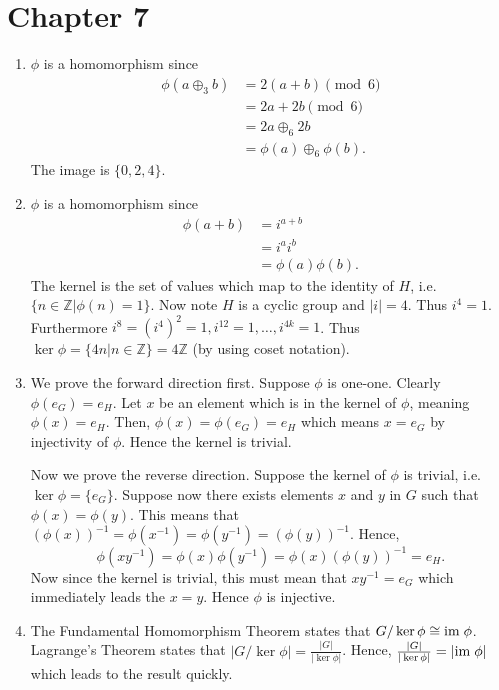 \section*{Chapter 7}
\begin{enumerate}
    \item $\phi$ is a homomorphism since
    \begin{align*}
        \phi(a \oplus_3 b) &= 2(a+b) \pmod{6}\\
        &= 2a + 2b \pmod{6}\\
        &= 2a \oplus_6 2b\\
        &= \phi(a) \oplus_6 \phi(b).
    \end{align*}
    The image is $\{0, 2, 4\}$.

    \item $\phi$ is a homomorphism since
    \begin{align*}
        \phi(a+b) &= i^{a+b}\\
        &=i^ai^b\\
        &=\phi(a)\phi(b).
    \end{align*}
    The kernel is the set of values which map to the identity of $H$, i.e. $\{n \in \mathbb{Z} \vert \phi(n) = 1\}$. Now note $H$ is a cyclic group and $|i| = 4$. Thus $i^4 = 1$. Furthermore $i^8 = (i^4)^2 = 1, i^{12} = 1, \dots, i^{4k} = 1$. Thus $\ker\phi = \{4n \vert n \in \mathbb{Z}\} = 4\mathbb{Z}$ (by using coset notation).

    \item We prove the forward direction first. Suppose $\phi$ is one-one. Clearly $\phi(e_G) = e_H$. Let $x$ be an element which is in the kernel of $\phi$, meaning $\phi(x) = e_H$. Then, $\phi(x) = \phi(e_G) = e_H$ which means $x = e_G$ by injectivity of $\phi$. Hence the kernel is trivial.

    Now we prove the reverse direction. Suppose the kernel of $\phi$ is trivial, i.e. $\ker \phi = \{e_G\}$. Suppose now there exists elements $x$ and $y$ in $G$ such that $\phi(x) = \phi(y)$. This means that $(\phi(x))^{-1} = \phi(x^{-1}) = \phi(y^{-1}) = (\phi(y))^{-1}$. Hence,
    \[
        \phi(xy^{-1}) = \phi(x)\phi(y^{-1}) = \phi(x)\left(\phi(y)\right)^{-1} = e_H.
    \]
    Now since the kernel is trivial, this must mean that $xy^{-1} = e_G$ which immediately leads the $x=y$. Hence $\phi$ is injective.

    \item The Fundamental Homomorphism Theorem states that $G / \ker \phi \cong \mathrm{im}\; \phi$. Lagrange's Theorem states that $|G / \ker \phi| = \frac{|G|}{|\ker\phi|}$. Hence, $\frac{|G|}{|\ker\phi|} = |\mathrm{im}\;\phi|$ which leads to the result quickly.


\end{enumerate}
